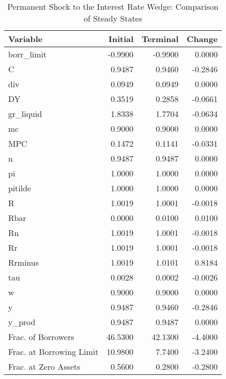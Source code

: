 \documentclass[12pt]{article} %
\numberwithin{equation}{section} %
\begin{document}
\begin{table}[h]
\centering
\caption{Permanent Shock to the Interest Rate Wedge: Comparison of Steady States}
\label{tab:stst_Baseline_Wedge_Permanent}
\begin{tabular}{lrrr}
                Variable &  Initial &  Terminal &  Change \\
\hline
\hline
              borr\_limit &  -0.9900 &   -0.9900 &  0.0000 \\
                       C &   0.9487 &    0.9460 & -0.2846 \\
                     div &   0.0949 &    0.0949 &  0.0000 \\
                      DY &   0.3519 &    0.2858 & -0.0661 \\
               gr\_liquid &   1.8338 &    1.7704 & -0.0634 \\
                      mc &   0.9000 &    0.9000 &  0.0000 \\
                     MPC &   0.1472 &    0.1141 & -0.0331 \\
                       n &   0.9487 &    0.9487 &  0.0000 \\
                      pi &   1.0000 &    1.0000 &  0.0000 \\
                 pitilde &   1.0000 &    1.0000 &  0.0000 \\
                       R &   1.0019 &    1.0001 & -0.0018 \\
                    Rbar &   0.0000 &    0.0100 &  0.0100 \\
                      Rn &   1.0019 &    1.0001 & -0.0018 \\
                      Rr &   1.0019 &    1.0001 & -0.0018 \\
                 Rrminus &   1.0019 &    1.0101 &  0.8184 \\
                     tau &   0.0028 &    0.0002 & -0.0026 \\
                       w &   0.9000 &    0.9000 &  0.0000 \\
                       y &   0.9487 &    0.9460 & -0.2846 \\
                  y\_prod &   0.9487 &    0.9487 &  0.0000 \\
      Frac. of Borrowers &  46.5300 &   42.1300 & -4.4000 \\
Frac. at Borrowing Limit &  10.9800 &    7.7400 & -3.2400 \\
    Frac. at Zero Assets &   0.5600 &    0.2800 & -0.2800 \\
\hline
\end{tabular}
\end{table}
\end{document}
